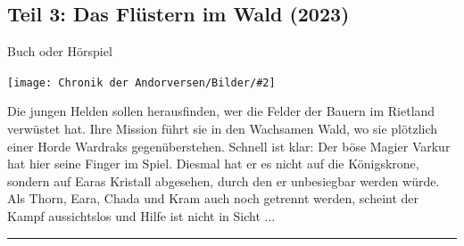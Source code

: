 \documentclass[10pt, a4paper, oneside]{book}
\newcommand{\fillbreak}{\vspace*{\fill}\columnbreak}
\newcommand{\produkt}[1]{%
    \section{#1}%
    \label{Produkt: #1}%
}
\newcommand{\bildmitts}[2][height=0.32\textwidth,width=0.48\textwidth,keepaspectratio]{%
    \begin{center}
        \texttt{[image: Chronik der Andorversen/Bilder/\#2]}
    \end{center}
}
\begin{document}
\begin{multicols}{2}
\fillbreak
\produkt{Teil 3: Das Flüstern im Wald (2023)}

\begin{center}
    Buch oder Hörspiel
\end{center}

\bildmitts{Das Flüstern im Wald (2023).png}

Die jungen Helden sollen herausfinden, wer die Felder der Bauern im Rietland verwüstet hat. Ihre Mission führt sie in den Wachsamen Wald, wo sie plötzlich einer Horde Wardraks gegenüberstehen. Schnell ist klar: Der böse Magier Varkur hat hier seine Finger im Spiel. Diesmal hat er es nicht auf die Königskrone, sondern auf Earas Kristall abgesehen, durch den er unbesiegbar werden würde. Als Thorn, Eara, Chada und Kram auch noch getrennt werden, scheint der Kampf aussichtslos und Hilfe ist nicht in Sicht ...

\end{multicols}

\hrule
\end{document}
